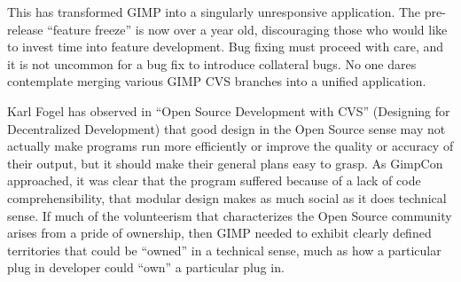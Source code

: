 This has transformed GIMP into a singularly unresponsive application.
The pre-release ``feature freeze'' is now over a year old, discouraging
those who would like to invest time into feature development.
 Bug fixing must proceed with care, and it is not uncommon for a bug fix 
to introduce collateral bugs. No one dares contemplate merging various
GIMP CVS branches into a unified application. 

Karl Fogel has observed in ``Open Source Development with CVS''
(Designing for Decentralized Development) that good design in the Open
Source sense may not actually make programs run more efficiently or
improve the quality or accuracy of their output, but it should make
their general plans easy to grasp. As GimpCon approached, it was clear
that the program suffered because of a lack of code comprehensibility, that
modular design makes as much social as it does technical sense. If
much of the volunteerism that characterizes the Open Source community
arises from a pride of ownership, then GIMP needed to exhibit clearly
defined territories that could be ``owned'' in a technical sense, much as
how a particular plug in developer could ``own'' a particular plug in. 
